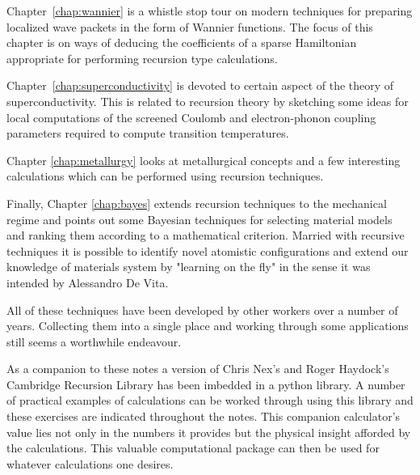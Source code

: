 Chapter~\ref{chap:wannier} is a whistle stop tour 
on modern techniques for preparing localized wave packets in the 
form of Wannier functions. The focus of this chapter is on 
ways of deducing the coefficients of a sparse Hamiltonian
appropriate for performing recursion type calculations.


Chapter~\ref{chap:superconductivity} is devoted to
certain aspect of the theory of superconductivity. 
This is related to recursion theory by sketching some ideas for 
local computations of the screened Coulomb and electron-phonon
coupling parameters required to compute transition temperatures.

Chapter \ref{chap:metallurgy} looks at metallurgical concepts 
and a few interesting calculations which can be performed 
using recursion techniques. 

Finally, Chapter \ref{chap:bayes} extends recursion techniques
to the mechanical regime and points out some Bayesian techniques 
for selecting material models and ranking them according 
to a mathematical criterion. Married with recursive techniques
it is possible to identify novel atomistic configurations
and extend our knowledge of materials system by "learning on the fly" 
in the sense it was intended by Alessandro De Vita.

All of these techniques have been developed by other workers 
over a number of years. Collecting them into a single place 
and working through some applications still seems a worthwhile 
endeavour. 

As a companion to these notes a version of Chris Nex's and 
Roger Haydock's Cambridge Recursion Library
has been imbedded in a python library. A number of practical examples 
of calculations can be worked through using this library and these 
exercises are indicated throughout the notes. 
This companion calculator's value lies not only
in the numbers it provides but the physical insight afforded by the 
calculations. This valuable computational package can then be used for 
whatever calculations one desires.

